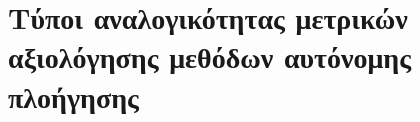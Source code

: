 \section{Τύποι αναλογικότητας μετρικών αξιολόγησης μεθόδων αυτόνομης πλοήγησης}
  \label{appendix:proportionality_contribution}
  
